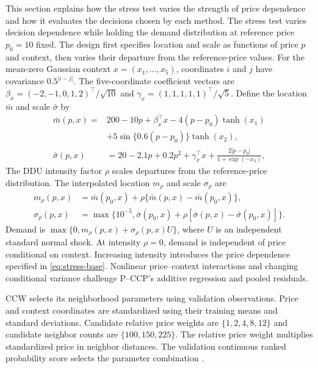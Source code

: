 This section explains how the stress test varies the strength of price dependence and how it evaluates the decisions chosen by each method. The stress test varies decision dependence while holding the demand distribution at reference price $p_0=10$ fixed. The design first specifies location and scale as functions of price $p$ and context, then varies their departure from the reference-price values. For the mean-zero Gaussian context $x=(x_1,\ldots,x_5)$, coordinates $i$ and $j$ have covariance $0.5^{|i-j|}$. The five-coordinate coefficient vectors are $\beta_x=(-2,-1,0,1,2)^\top/\sqrt{10}$ and $\gamma_x=(1,1,1,1,1)^\top/\sqrt5$. Define the location $\bar m$ and scale $\bar\sigma$ by
\begin{align}
 \bar m(p,x)={}&200-10p+\beta_x^\top x-4(p-p_0)\tanh(x_1)\nonumber\\
 &+5\sin\{0.6(p-p_0)\}\tanh(x_2),\nonumber\\
 \bar\sigma(p,x)&=20-2.1p+0.2p^2+\gamma_x^\top x
 +\frac{2|p-p_0|}{1+\exp(-x_3)},\label{eq:stress-base}
\end{align}
The DDU intensity factor $\rho$ scales departures from the reference-price distribution. The interpolated location $m_\rho$ and scale $\sigma_\rho$ are
\begin{align}
 m_\rho(p,x)&=\bar m(p_0,x)+\rho\{\bar m(p,x)-\bar m(p_0,x)\},\nonumber\\
 \sigma_\rho(p,x)&=\max\{10^{-5},\bar\sigma(p_0,x)+\rho[\bar\sigma(p,x)-\bar\sigma(p_0,x)]\}.\label{eq:stress-interpolation}
\end{align}
Demand is $\max\{0,m_\rho(p,x)+\sigma_\rho(p,x)U\}$, where $U$ is an independent standard normal shock. At intensity $\rho=0$, demand is independent of price conditional on context. Increasing intensity introduces the price dependence specified in \eqref{eq:stress-base}. Nonlinear price--context interactions and changing conditional variance challenge P--CCP's additive regression and pooled residuals.

CCW selects its neighborhood parameters using validation observations. Price and context coordinates are standardized using their training means and standard deviations. Candidate relative price weights are $\{1,2,4,8,12\}$ and candidate neighbor counts are $\{100,150,225\}$. The relative price weight multiplies standardized price in neighbor distances. The validation continuous ranked probability score selects the parameter combination \citep{gneiting2007strictly}.

